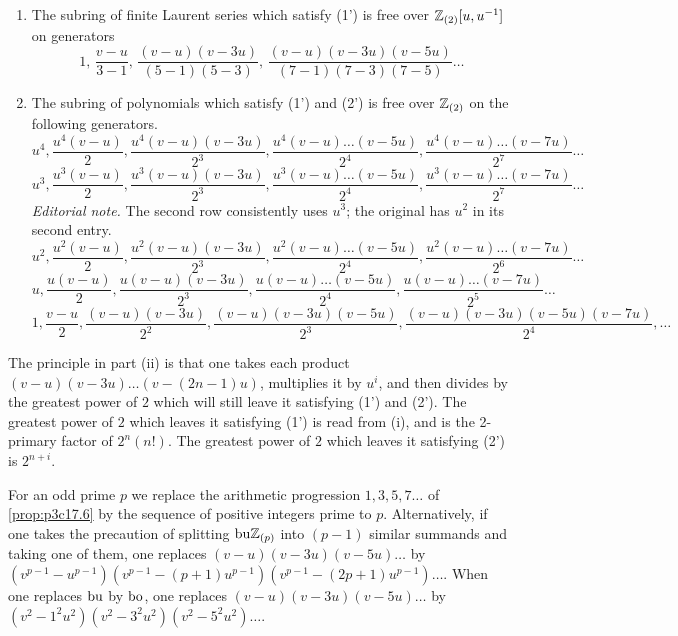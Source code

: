 \documentclass[../main]{subfiles}
\begin{document}
\begin{proposition}
\label{prop:p3c17.6} 

\begin{enumerate}
    \item[(i)] The subring of finite Laurent series which satisfy (1') is free over $\mathbb{Z}_{(2)}[u, u^{-1}]$ on generators \[1, \, \frac {v - u} {3 - 1}, \, \frac {(v - u)(v - 3u)} {(5 - 1)(5-3)}, \, \frac {(v - u)(v - 3u)(v - 5u)} {(7 - 1)(7 - 3)(7 - 5)} \ldots\]
    \item[(ii)] The subring of polynomials which satisfy (1') and (2') is free over $\mathbb{Z}_{(2)}$ on the following generators. 
    \[u^4, \frac {u^4(v - u)} 2, \frac {u^4(v - u)(v - 3u)} {2^3}, \frac {u^4(v - u)\ldots(v - 5u)} {2^4}, \frac {u^4(v - u) \ldots (v - 7u)} {2^7} \ldots\] 
    \[u^3, \frac {u^3(v - u)} 2, \frac {u^3(v - u)(v - 3u)} {2^3}, \frac {u^3(v - u)\ldots(v - 5u)} {2^4}, \frac {u^3(v - u) \ldots (v - 7u)} {2^7} \ldots\]
\noindent\textit{Editorial note.} The second row consistently uses $u^3$; the original has $u^2$ in its second entry.
    \[u^2, \frac {u^2(v - u)} 2, \frac {u^2(v - u)(v - 3u)} {2^3}, \frac {u^2(v - u)\ldots(v - 5u)} {2^4}, \frac {u^2(v - u) \ldots (v - 7u)} {2^6} \ldots\]
    \[u, \frac {u(v - u)} 2, \frac {u(v - u)(v - 3u)} {2^3}, \frac {u(v - u)\ldots(v - 5u)} {2^4}, \frac {u(v - u) \ldots (v - 7u)} {2^5} \ldots\]
    \[1, \frac {v - u} 2, \frac {(v - u)(v - 3u)} {2^2}, \frac {(v - u)(v - 3u)(v - 5u)} {2^3}, \frac {(v - u)(v - 3u)(v - 5u)(v - 7u)} {2^4}, \ldots\]
\end{enumerate}
\end{proposition}

The principle in part (ii) is that one takes each product $(v-u)(v-3u)\ldots(v-(2n-1)u)$, multiplies it by $u^i$, and then divides by the greatest power of $2$ which will still leave it satisfying (1') and (2'). The greatest power of $2$ which leaves it satisfying (1') is read from (i), and is the 2-primary factor of $2^n(n!)$. The greatest power of $2$ which leaves it satisfying (2') is $2^{n+i}$.

\begin{remark*}
For an odd prime $p$ we replace the arithmetic progression $1, 3, 5, 7\dots$ of \ref{prop:p3c17.6} by the sequence of positive integers prime to $p$. Alternatively, if one takes the precaution of splitting $\mathrm{bu}\mathbb{Z}_{(p)}$ into $(p - 1)$ similar summands and taking one of them, one replaces $(v - u)(v - 3u)(v - 5u) \ldots$ by $(v^{p - 1} - u^{p - 1}) (v^{p - 1} - (p + 1)u^{p-1}) (v^{p - 1} - (2 p + 1)u^{p - 1}) \ldots$. When one replaces $\mathrm{bu}$ by $\mathrm{bo}$, one replaces $(v - u)(v - 3u)(v - 5u) \ldots$ by $(v^2 - 1^2 u^2)(v^2 - 3^2 u^2) (v^2 - 5^2 u^2)\ldots$. 
\end{remark*}
\end{document}
